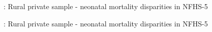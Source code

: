 \documentclass[12pt]{article}
\begin{document}
\begin{table}[H]
    \centering
    \begin{threeparttable}
        \caption{: Rural private sample - neonatal mortality disparities in NFHS-5}
        \label{tab:regression}

        \scriptsize
        \setlength{\tabcolsep}{9pt}
        \renewcommand{\arraystretch}{1.5}

        {}

    \end{threeparttable}
\end{table}



\begin{table}[H]
    \centering
    \begin{threeparttable}
        \caption{: Rural private sample - neonatal mortality disparities in NFHS-5}
        \label{tab:regression}

        \scriptsize
        \setlength{\tabcolsep}{9pt}
        \renewcommand{\arraystretch}{1.5}

        {}

    \end{threeparttable}
\end{table}
\end{document}
